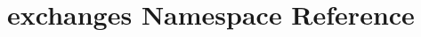 \hypertarget{namespaceexchanges}{}\section{exchanges Namespace Reference}
\label{namespaceexchanges}
